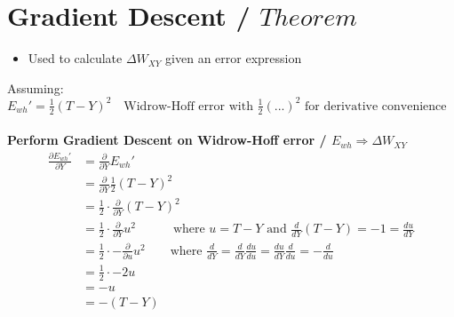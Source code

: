 \documentclass[12 pt]{article}
\begin{document}
\newpage\thispagestyle{empty}
\section*{Gradient Descent / $Theorem$}

	\begin{itemize}
		\item Used to calculate $\Delta W_{XY}$ given an error expression
	\end{itemize}

	Assuming:
		$
			E_{wh}' = \frac{1}{2}(T - Y)^2 \quad\text{Widrow-Hoff error with } \frac{1}{2}(...)^2 \text{ for derivative convenience}
		$\\\\

	\textbf{Perform Gradient Descent on Widrow-Hoff error / $E_{wh} \Rightarrow \Delta W_{XY}$}
	\begin{align*}
		\frac{\partial E_{wh}'}{\partial Y} &= \frac{\partial }{\partial Y} E_{wh}'\\
		&= \frac{\partial }{\partial Y} \frac{1}{2}(T - Y)^2\\
		&= \frac{1}{2} \cdot \frac{\partial }{\partial Y} (T - Y)^2\\
		&= \frac{1}{2} \cdot \frac{\partial }{\partial Y} u^2 \quad\quad\quad\text{where } u = T - Y \text{ and } \frac{d}{dY} (T - Y) = -1 = \frac{du}{dY}\\
		&= \frac{1}{2} \cdot -\frac{\partial }{\partial u} u^2 \quad\quad\text{where } \frac{d}{dY} = \frac{d}{dY}\frac{du}{du} = \frac{du}{dY}\frac{d}{du} = -\frac{d}{du}\\
		&= \frac{1}{2} \cdot -2u\\
		&= -u\\
		&= -(T - Y)
	\end{align*}
\end{document}
